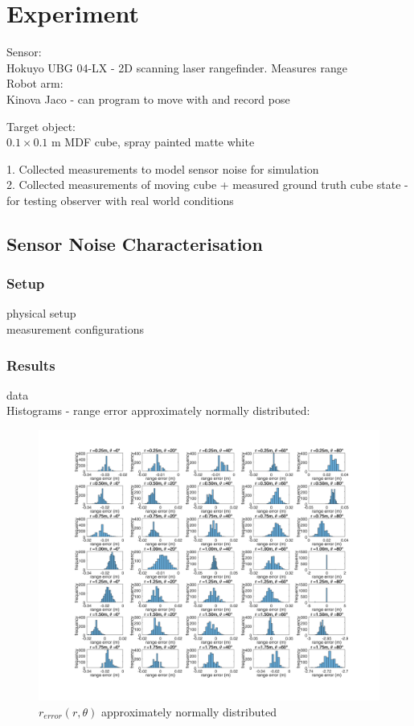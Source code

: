 \chapter{Experiment}
Sensor:\\
Hokuyo UBG 04-LX - 2D scanning laser rangefinder. Measures range\\

Robot arm: \\
Kinova Jaco - can program to move with and record pose

Target object: \\
$0.1 \times 0.1$ m MDF cube, spray painted matte white

1. Collected measurements to model sensor noise for simulation\\
2. Collected measurements of moving cube + measured ground truth cube state - for testing observer with real world conditions

\section{Sensor Noise Characterisation}
	\subsection{Setup}
		physical setup\\
		measurement configurations 
	\subsection{Results}
		data\\
		Histograms - range error approximately normally distributed:
		\begin{figure}
		  \includegraphics[width=1.25\textwidth,trim = 0mm 0mm 0mm 0mm,clip]{./Figures/range_error_histograms.jpg}
		  \caption{$r_{error}(r,\theta)$ approximately normally distributed}
		\end{figure}
		
